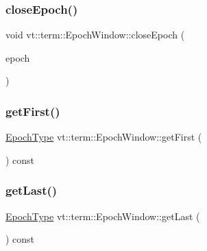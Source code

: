 \subsubsection{\texorpdfstring{close\+Epoch()}{closeEpoch()}}
{\footnotesize\ttfamily void vt\+::term\+::\+Epoch\+Window\+::close\+Epoch (\begin{DoxyParamCaption}\item[{\hyperlink{namespacevt_a985a5adf291c34a3ca263b3378388236}{Epoch\+Type} const \&}]{epoch }\end{DoxyParamCaption})}

\mbox{\label{structvt_1_1term_1_1_epoch_window_a2775ad5ee039b9c319403ec4184cdd1c}} 
\subsubsection{\texorpdfstring{get\+First()}{getFirst()}}
{\footnotesize\ttfamily \hyperlink{namespacevt_a985a5adf291c34a3ca263b3378388236}{Epoch\+Type} vt\+::term\+::\+Epoch\+Window\+::get\+First (\begin{DoxyParamCaption}{ }\end{DoxyParamCaption}) const\hspace{0.3cm}{\ttfamily [inline]}}

\mbox{\label{structvt_1_1term_1_1_epoch_window_a3e3f2c54fef79025183e4edb61f404dd}} 
\subsubsection{\texorpdfstring{get\+Last()}{getLast()}}
{\footnotesize\ttfamily \hyperlink{namespacevt_a985a5adf291c34a3ca263b3378388236}{Epoch\+Type} vt\+::term\+::\+Epoch\+Window\+::get\+Last (\begin{DoxyParamCaption}{ }\end{DoxyParamCaption}) const\hspace{0.3cm}{\ttfamily [inline]}}

\mbox{\label{structvt_1_1term_1_1_epoch_window_ac33e7c5184370881532550540f2aa7b3}} 
